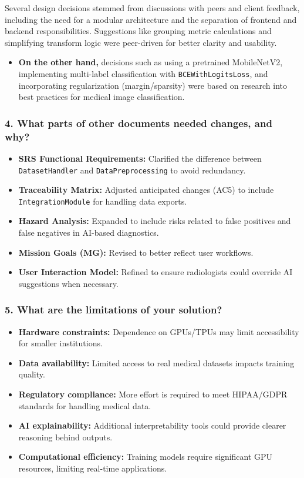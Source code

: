 \documentclass[12pt, titlepage]{article}
\begin{document}
Several design decisions stemmed from discussions with peers and client feedback, including the need for a modular architecture and the separation of frontend and backend responsibilities. Suggestions like grouping metric calculations and simplifying transform logic were peer-driven for better clarity and usability. 

\begin{itemize}
    \item \textbf{On the other hand,} decisions such as using a pretrained MobileNetV2, implementing multi-label classification with \texttt{BCEWithLogitsLoss}, and incorporating regularization (margin/sparsity) were based on research into best practices for medical image classification.
\end{itemize}

\subsubsection{4. What parts of other documents needed changes, and why?}
\label{sec:documentschanges}

\begin{itemize}
    \item \textbf{SRS Functional Requirements:} Clarified the difference between \texttt{DatasetHandler} and \texttt{DataPreprocessing} to avoid redundancy.
    \item \textbf{Traceability Matrix:} Adjusted anticipated changes (AC5) to include \texttt{IntegrationModule} for handling data exports.
    \item \textbf{Hazard Analysis:} Expanded to include risks related to false positives and false negatives in AI-based diagnostics.
    \item \textbf{Mission Goals (MG):} Revised to better reflect user workflows.
    \item \textbf{User Interaction Model:} Refined to ensure radiologists could override AI suggestions when necessary.
\end{itemize}

\subsubsection{5. What are the limitations of your solution?}
\label{sec:limitations}

\begin{itemize}
    \item \textbf{Hardware constraints:} Dependence on GPUs/TPUs may limit accessibility for smaller institutions.
    \item \textbf{Data availability:} Limited access to real medical datasets impacts training quality.
    \item \textbf{Regulatory compliance:} More effort is required to meet HIPAA/GDPR standards for handling medical data.
    \item \textbf{AI explainability:} Additional interpretability tools could provide clearer reasoning behind outputs.
    \item \textbf{Computational efficiency:} Training models require significant GPU resources, limiting real-time applications.
\end{itemize}
\end{document}
